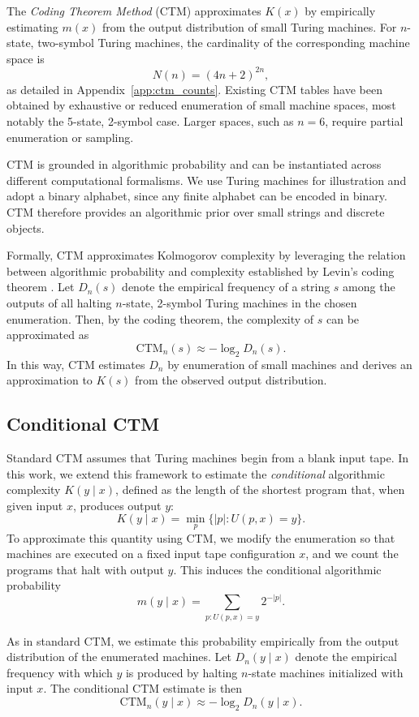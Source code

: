 \documentclass{article}
\begin{document}
The \emph{Coding Theorem Method} (CTM) \cite{delahaye_numerical_2012, soler-toscano_calculating_2014} approximates \(K(x)\) by empirically estimating \(m(x)\) from the output distribution of small Turing machines. For \(n\)-state, two-symbol Turing machines, the cardinality of the corresponding machine space is
\[
N(n)=(4n+2)^{2n},
\]
as detailed in Appendix~\ref{app:ctm_counts}. Existing CTM tables have been obtained by exhaustive or reduced enumeration of small machine spaces, most notably the 5-state, 2-symbol case. Larger spaces, such as \(n=6\), require partial enumeration or sampling.

CTM is grounded in algorithmic probability and can be instantiated across different computational formalisms. We use Turing machines for illustration and adopt a binary alphabet, since any finite alphabet can be encoded in binary. CTM therefore provides an algorithmic prior over small strings and discrete objects.

Formally, CTM approximates Kolmogorov complexity by leveraging the relation between algorithmic probability and complexity established by Levin's coding theorem \cite{levin_laws_1974, levin_concrete_1977}. Let \(D_n(s)\) denote the empirical frequency of a string \(s\) among the outputs of all halting \(n\)-state, 2-symbol Turing machines in the chosen enumeration. Then, by the coding theorem, the complexity of \(s\) can be approximated as
\[
\mathrm{CTM}_n(s) \approx -\log_2 D_n(s).
\]
In this way, CTM estimates \(D_n\) by enumeration of small machines and derives an approximation to \(K(s)\) from the observed output distribution.

\subsection{Conditional CTM}

Standard CTM assumes that Turing machines begin from a blank input tape. In this work, we extend this framework to estimate the \emph{conditional} algorithmic complexity \(K(y \mid x)\), defined as the length of the shortest program that, when given input \(x\), produces output \(y\):
\[
K(y \mid x) = \min_{p} \{ |p| : U(p, x) = y \}.
\]
To approximate this quantity using CTM, we modify the enumeration so that machines are executed on a fixed input tape configuration \(x\), and we count the programs that halt with output \(y\). This induces the conditional algorithmic probability
\[
m(y \mid x) = \sum_{p : U(p, x) = y} 2^{-|p|}.
\]

As in standard CTM, we estimate this probability empirically from the output distribution of the enumerated machines. Let \(D_n(y \mid x)\) denote the empirical frequency with which \(y\) is produced by halting \(n\)-state machines initialized with input \(x\). The conditional CTM estimate is then
\[
\mathrm{CTM}_n(y \mid x) \approx -\log_2 D_n(y \mid x).
\]
\end{document}
